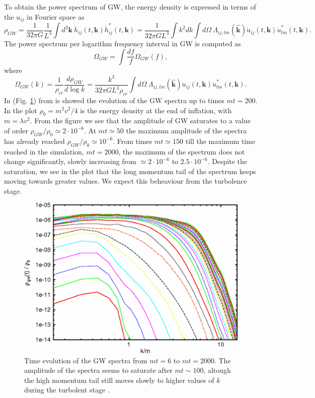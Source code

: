\documentclass[11pt,a4paper,twoside]{book}
\begin{document}
To obtain the power spectrum of GW, the energy density is expressed in terms of the  $u_{ij}  $ in Fourier space as
\begin{equation}
\label{Chap7:HybridModels_EnergyDensity}
\rho_{GW}=\frac{1}{32\pi G}\frac{1}{L^{3}}\int d^{3}\textbf{k}\ \dot{h}_{ij}(t,\textbf{k})\dot{h}^{*}_{ij}(t,\textbf{k})
=\frac{1}{32\pi G L^{3}}  \int k^{2}dk \int d\Omega\  \Lambda_{ij,lm}(\hat{\textbf{k}}) \dot{u}_{ij}(t,\textbf{k}) \dot{u}_{lm}^{*}(t,\textbf{k}).
\end{equation} 
The power spectrum per logarithm frequency interval in GW is computed as 
\begin{equation}
\Omega_{GW}=\int \frac{df}{f}\Omega_{GW}(f),
\end{equation}
where 
\begin{equation}
\Omega_{GW}(k) = \frac{1}{\rho_{cr}}\frac{d\rho_{GW}}{d \log k}= \frac{k^{3}}{32\pi GL^{3}\rho_{cr}}\int d\Omega\  \Lambda_{ij,lm}(\hat{\textbf{k}})\dot{u}_{ij}(t,\textbf{k}) \dot{u}_{lm}^{*}(t,\textbf{k}).
\end{equation}
In (Fig. \ref{fig:hybridfig9}) from \cite{Chap7:HybridModel} is showed the evolution of the GW spectra up to times $ mt=200 $. In the plot $ \rho_{0}=m^{2}v^{2}/4 $ is the energy density at the end of inflation, with $ m=\lambda v^{2} $. From the figure we see that the amplitude of GW saturates to a value of order $ \rho_{GW}/\rho_{0} \simeq 2 \cdot 10^{-6} $. At $ mt \simeq 50 $ the maximum amplitude of the spectra has already reached $ \rho_{GW}/\rho_{0} \simeq 10^{-6} $. From times $ mt\simeq 150 $ till the maximum time reached in the simulation, $ mt=2000 $, the maximum of the spectrum does not change significantly, slowly increasing from $ \simeq 2\cdot 10^{-6} $ to $ 2.5 \cdot 10^{-6} $. Despite the saturation, we see in the plot that the long momentum tail of the spectrum keeps moving towards greater values. We expect this beheaviour from the turbolence stage. 
\begin{figure}
	\centering
	\includegraphics[width=0.65\linewidth, height=0.35\textheight]{Images/Chap7/Hybrid_Fig9}
	\caption{Time evolution of the GW spectra from $ mt=6 $ to $ mt=2000 $. The amplitude of the spectra seems to saturate after $ mt \sim 100 $, altough the high momentum tail still moves slowly to higher values of $ k $ during the turbolent stage \cite{Chap7:HybridModel}.}
	\label{fig:hybridfig9}
\end{figure}
\end{document}
